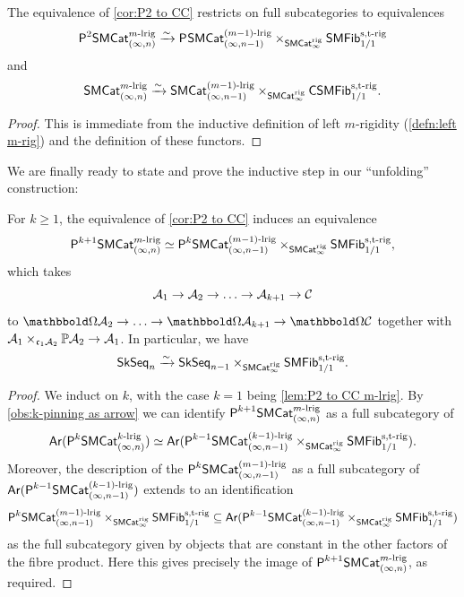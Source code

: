 \documentclass[a4paper,11pt]{article}
\begin{document}
\begin{lemma}\label{lem:P2 to CC m-lrig}
  The equivalence of \cref{cor:P2 to CC} restricts on full
  subcategories to equivalences
  \[ \PSMCat[2]_{(\infty,n)}^{m\dlrig} \isoto
    \PSMCat_{(\infty,n-1)}^{(m-1)\dlrig} \times_{\SMCatI^{\rig}}
    \SMFib_{1/1}^{\strig}\]
  and
  \[ \SMCat_{(\infty,n)}^{m\dlrig} \isoto
    \SMCat_{(\infty,n-1)}^{(m-1)\dlrig} \times_{\SMCatI^{\rig}}
    \CSMFib_{1/1}^{\strig}.\]
\end{lemma}
\begin{proof}
  This is immediate from the inductive definition of left $m$-rigidity
  (\cref{defn:left m-rig}) and the definition of these functors.
\end{proof}

We are finally ready to state and prove the inductive step in our
``unfolding'' construction:

\begin{propn}\label{propn:1-step m-rig pinned}
  For $k \geq 1$, the equivalence of \cref{cor:P2 to CC} induces an equivalence
    \[ \PSMCat[k+1]_{(\infty,n)}^{m\dlrig} \simeq
    \PSMCat[k]_{(\infty,n-1)}^{(m-1)\dlrig} \times_{\SMCatI^{\rig}}
    \SMFib_{1/1}^{\strig},\]
  which takes
  \[ \nA_{1} \to \nA_{2} \to \dots \to \nA_{k+1} \to \nC \]
  to $\mOm \nA_{2} \to \dots \to \mOm \nA_{k+1} \to \mOm \nC$ together
  with $\nA_{1} \times_{\core \nA_{2}}\mP \nA_{2} \to \nA_{1}$. In
  particular, we have
  \[ \SkSeq_{n} \isoto \SkSeq_{n-1} \times_{\SMCatI^{\rig}}
    \SMFib_{1/1}^{\strig}.\]
\end{propn}
\begin{proof}
  We induct on $k$, with the case $k = 1$ being \cref{lem:P2 to CC
    m-lrig}. By \cref{obs:k-pinning as arrow} we can identify
  $\PSMCat[k+1]_{(\infty,n)}^{m\dlrig}$ as a full subcategory of
  \[ \Ar(\PSMCat[k]_{(\infty,n)}^{k\dlrig}) \simeq
    \Ar(\PSMCat[k-1]_{(\infty,n-1)}^{(k-1)\dlrig}
    \times_{\SMCatI^{\rig}} \SMFib_{1/1}^{\strig}).\] Moreover, the
  description of the \icat{} $\PSMCat[k]_{(\infty,n-1)}^{(m-1)\dlrig}$ as a full
  subcategory of $\Ar(\PSMCat[k-1]_{(\infty,n-1)}^{(k-1)\dlrig})$
  extends to an identification 
  \[\PSMCat[k]_{(\infty,n-1)}^{(m-1)\dlrig} \times_{\SMCatI^{\rig}}
  \SMFib_{1/1}^{\strig} \subseteq 
  \Ar(\PSMCat[k-1]_{(\infty,n-1)}^{(k-1)\dlrig}
  \times_{\SMCatI^{\rig}} \SMFib_{1/1}^{\strig}) \] as the full subcategory given by objects that
  are constant in the other factors of the fibre product. Here this
  gives precisely the image of $\PSMCat[k+1]_{(\infty,n)}^{m\dlrig}$, as required.
\end{proof}
\end{document}
